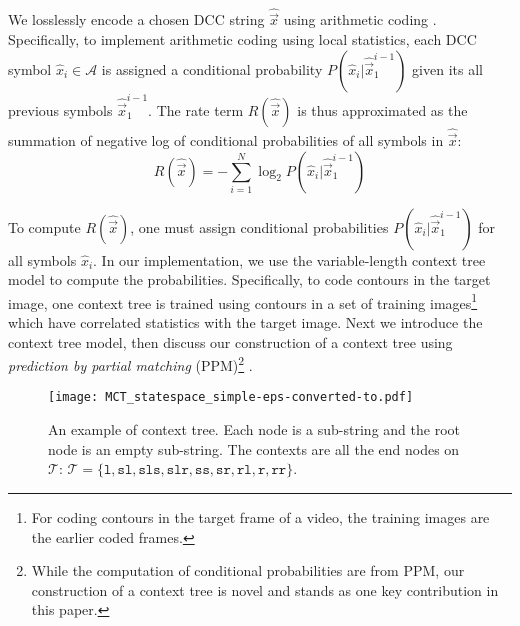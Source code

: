 We losslessly encode a chosen DCC string $\hat{\vec{x}}$ using arithmetic coding \cite{DCC1st1991}. 
Specifically, to implement arithmetic coding using local statistics, each DCC symbol $\hat{x}_i \in \mathcal{A}$ is assigned a conditional probability $P(\hat{x}_i|\hat{\vec{x}}_{1}^{i-1})$ given its all previous symbols $\hat{\vec{x}}_{1}^{i-1}$.
The rate term $R(\hat{\vec{x}})$ is thus approximated as the summation of negative log of conditional probabilities of all symbols in $\hat{\vec{x}}$:
\begin{equation}
\label{eq:rate}
R(\hat{\vec{x}})= - \sum\limits_{i=1}^N \log_2 P(\hat{x}_i|\hat{\vec{x}}_{1}^{i-1}) 
\end{equation}

To compute $R(\hat{\vec{x}})$, one must assign conditional probabilities $P(\hat{x}_i|\hat{\vec{x}}_{1}^{i-1})$ for all symbols $\hat{x}_i$.
In our implementation, we use the variable-length context tree model \cite{begleiter2004prediction} to compute the probabilities.
Specifically, to code contours in the target image, one context tree is trained using contours in a set of training images\footnote{For coding contours in the target frame of a video, the training images are the earlier coded frames.} which have correlated statistics with the target image.
Next we introduce the context tree model, then discuss our construction of a context tree using \textit{prediction by partial matching} (PPM)\footnote{While the computation of conditional probabilities are from PPM, our construction of a context tree is novel and stands as one key contribution in this paper.} \cite{moffat1990implementing}.

\begin{figure}[t]

\begin{minipage}[b]{1\linewidth}
  \centering
  \centerline{\texttt{[image: MCT\_statespace\_simple-eps-converted-to.pdf]}}
  \centerline{}
\end{minipage}

\vspace{-0.2cm}
\caption{An example of context tree.
Each node is a sub-string and the root node is an empty sub-string.
The contexts are all the end nodes on $\mathcal{T}$: $\mathcal{T}=\{\texttt{l},\texttt{sl},\texttt{sls},\texttt{slr},\texttt{ss},\texttt{sr},\texttt{rl},\texttt{r},\texttt{rr}\}$.}
\label{fig:MCT_statespace}
\end{figure}


